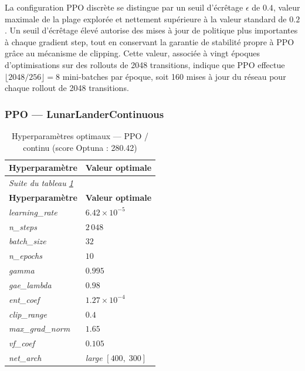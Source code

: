 \medskip
 
La configuration PPO discrète se distingue par un seuil d'écrêtage $\epsilon$ de
$0.4$, valeur maximale de la plage explorée et nettement supérieure à la
valeur standard de $0.2$ \parencite{schulmanProximalPolicyOptimization2017}.
Un seuil d'écrêtage élevé autorise des mises à jour de politique plus
importantes à chaque gradient step, tout en conservant la garantie de
stabilité propre à PPO grâce au mécanisme de clipping. Cette valeur, associée à vingt époques d'optimisations sur des rollouts de 2048 transitions, indique que PPO effectue $\lfloor 2048 / 256 \rfloor = 8$ mini-batches par époque, soit 160 mises à jour du réseau pour chaque rollout de 2048 transitions.
 
\newpage
\subsubsection{PPO --- LunarLanderContinuous}
 
\begingroup
\footnotesize
\setlength{\tabcolsep}{8pt}
\renewcommand{\arraystretch}{1.4}
\begin{longtable}{%
  p{\hpOptA}%
  p{\dimexpr\textwidth - \hpOptA - 4\tabcolsep\relax}%
}
  \caption{Hyperparamètres optimaux --- PPO / continu (score Optuna : 280.42)}
  \label{tab:hparams_opt_ppo_cont}\\
  \toprule
  \textbf{Hyperparamètre} & \textbf{Valeur optimale} \\
  \midrule
\endfirsthead
  \multicolumn{2}{l}{\footnotesize\itshape Suite du tableau \ref{tab:hparams_opt_ppo_cont}}\\[2pt]
  \toprule
  \textbf{Hyperparamètre} & \textbf{Valeur optimale} \\
  \midrule
\endhead
  \bottomrule
\endlastfoot
 
\textit{learning\_rate} & $6.42 \times 10^{-5}$ \\
\textit{n\_steps}       & $2\,048$ \\
\textit{batch\_size}    & $32$ \\
\textit{n\_epochs}      & $10$ \\
\textit{gamma}          & $0.995$ \\
\textit{gae\_lambda}    & $0.98$ \\
\textit{ent\_coef}      & $1.27 \times 10^{-4}$ \\
\textit{clip\_range}    & $0.4$ \\
\textit{max\_grad\_norm}& $1.65$ \\
\textit{vf\_coef}       & $0.105$ \\
\textit{net\_arch}      & \textit{large} $[400,\;300]$ \\
\end{longtable}
\endgroup
 
